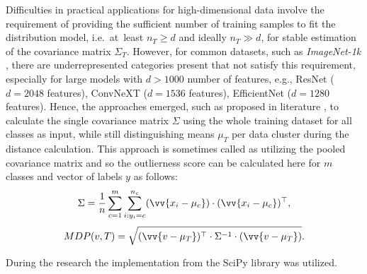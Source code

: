 Difficulties in practical applications for high-dimensional data involve the requirement of providing the sufficient number of training samples to fit the distribution model, i.e.~at~least $n_{T} \geq d$ and ideally $n_{T} \gg d$, for stable estimation of the covariance matrix $\Sigma_{T}$. However, for common datasets, such as \textit{ImageNet-1k} \cite{Russakovsky-2015}, there are underrepresented categories present that not satisfy this requirement, especially for large models with $d > 1000$ number of features, e.g., ResNet ($d = 2048$ features), ConvNeXT ($d = 1536$ features), EfficientNet ($d = 1280$ features). Hence, the approaches emerged, such as proposed in literature \cite{Lee-2018}\cite{Tajwar-2021}, to calculate the single covariance matrix $\Sigma$ using the whole training dataset for all classes as input, while still distinguishing means $\mu_{T}$ per data cluster during the distance calculation. This approach is sometimes called as utilizing the pooled covariance matrix \cite{Johnson-2007}\cite{Raninen-2022} and so the outlierness score can be calculated here for $m$ classes and vector of labels $y$ as follows:
\begin{equation}
    \Sigma
    =
    \frac{1}{n}
    \sum_{c=1}^{m}
    \sum_{i: y_i = c}^{n_c}
    (\vv{x_i - \mu_{c}})
    \cdot
    (\vv{x_i - \mu_{c}})^{\top}
    ,
    \label{eq:mdp-sigma}
\end{equation}
\begin{equation}
    MDP(v, T) = \sqrt{
        (\vv{v - \mu_{T}})^{\top}
        \cdot
        \Sigma^{-1}
        \cdot
        (\vv{v - \mu_{T}})
    }.
    \label{eq:mdp}
\end{equation}

During the research the implementation from the SciPy library \cite{SciPy-NMeth} was utilized.
